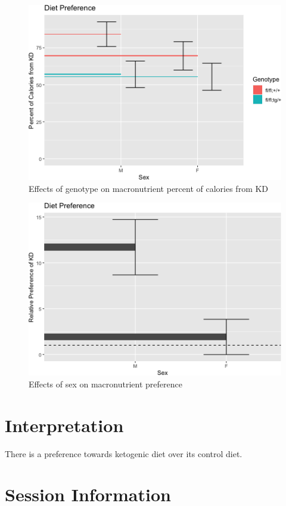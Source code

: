 \documentclass[]{article}
\begin{document}
\begin{figure}
\centering
\includegraphics{figures/knockout-effects-barplot-percent-1.png}
\caption{Effects of genotype on macronutrient percent of calories from
KD}
\end{figure}

\begin{figure}
\centering
\includegraphics{figures/sex-effects-barplot-1.png}
\caption{Effects of sex on macronutrient preference}
\end{figure}

\hypertarget{interpretation}{%
\section{Interpretation}\label{interpretation}}

There is a preference towards ketogenic diet over its control diet.

\hypertarget{session-information}{%
\section{Session Information}\label{session-information}}
\end{document}
